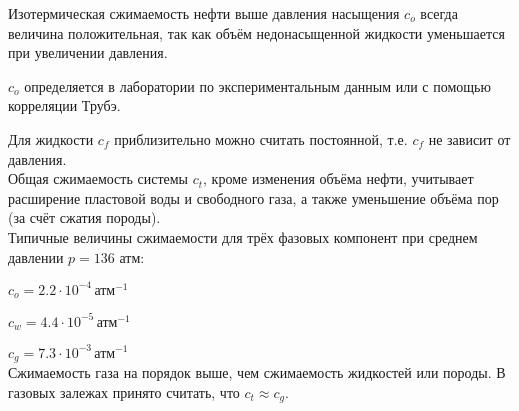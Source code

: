 Изотермическая сжимаемость нефти выше давления насыщения $c_o$ всегда величина положительная, так как объём недонасыщенной жидкости уменьшается при увеличении давления.

$c_o$ определяется в лаборатории по экспериментальным данным или с помощью корреляции Трубэ.

Для жидкости $c_f$ приблизительно можно считать постоянной, т.е. $c_f$ не зависит от давления.
\\

Общая сжимаемость системы $c_t$, кроме изменения объёма нефти, учитывает расширение пластовой воды и свободного газа, а также уменьшение объёма пор (за счёт сжатия породы).
\\

Типичные величины сжимаемости для трёх фазовых компонент при среднем давлении $p=136\text{ атм}$:

$c_o=2.2\cdot 10^{-4} \, \text{атм}^{-1}$

$c_w=4.4\cdot 10^{-5} \, \text{атм}^{-1}$

$c_g=7.3\cdot 10^{-3} \, \text{атм}^{-1}$
\\

Сжимаемость газа на порядок выше, чем сжимаемость жидкостей или породы.
В газовых залежах принято считать, что $c_t\approx c_g$.



